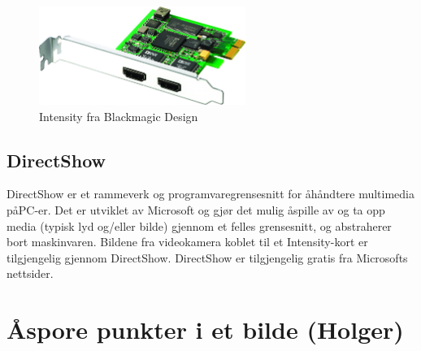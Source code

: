 		\begin{figure}[h]
		\centering
		\includegraphics[width=0.60\textwidth]{graphics/intensity.png}
		\caption{Intensity fra Blackmagic Design}
		\label{fig:intensity}
		\end{figure}
	
	\subsection{DirectShow}
	
		DirectShow er et rammeverk og programvaregrensesnitt for \aa \space h\aa ndtere multimedia p\aa \space PC-er. Det er utviklet av Microsoft og gj\o r det mulig \aa \space spille av og ta opp media (typisk lyd og/eller bilde) gjennom et felles grensesnitt, og abstraherer bort maskinvaren. Bildene fra videokamera koblet til et Intensity-kort er tilgjengelig gjennom DirectShow. DirectShow er tilgjengelig gratis fra Microsofts nettsider.

\section{\AA \space spore punkter i et bilde (Holger)}

	